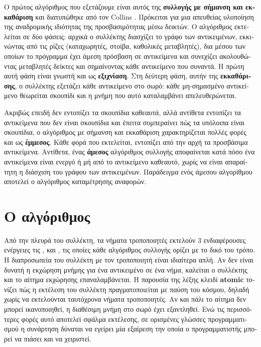 \begin{greek}
Ο πρώτος αλγόριθμος που εξετάζουμε είναι αυτός της 
\textbf{συλλογής με σήμανση και εκκαθάριση} και διατυπώθηκε από
τον Collins \cite{DBLP:journals/cacm/McCarthy60}. Πρόκειται για
μια απευθείας υλοποίηση της αναδρομικής ιδιότητας της προσβασιμότητας
μέσω δεικτών. Ο αλγόριθμος εκτελείται σε δύο φάσεις: αρχικά ο
συλλέκτης διασχίζει το γράφο των αντικειμένων, εκκινώντας από
τις ρίζες (καταχωρητές, στοίβα, καθολικές μεταβλητές), δια μέσου
των οποίων το πρόγραμμα έχει άμεση πρόσβαση σε αντικείμενα
και συνεχίζει ακολουθώντας μεταβλητές δείκτες και σημαίνοντας
κάθε αντικείμενο που συναντά. Η πρώτη αυτή φάση είναι γνωστή και
ως \textbf{εξιχνίαση}. Στη δεύτερη φάση, αυτήν της \textbf{εκκαθάρισης},
ο συλλέκτης εξετάζει κάθε αντικείμενο στο σωρό: κάθε μη-σημασμένο
αντικείμενο θεωρείται σκουπίδι και η μνήμη που αυτό καταλαμβάνει
απελευθερώνεται.

Ακριβώς επειδή δεν εντοπίζει τα σκουπίδια καθεαυτά, αλλά αντίθετα 
εντοπίζει τα αντικείμενα που δεν είναι σκουπίδια και έπειτα 
συμπεραίνει πώς τα υπόλοιπα είναι σκουπίδια, ο αλγόριθμος με 
σήμανση και εκκαθάριση χαρακτηρίζεται πολλές φορές και ως
\textbf{έμμεσος}. Κάθε φορά που εκτελείται, εντοπίζει 
από την αρχή τα προσβάσιμα αντικείμενα. Αντίθετα, ένας 
\textbf{άμεσος} αλγόριθμος συλλογής αποφαίνεται κατά 
πόσο ένα αντικείμενα είναι ενεργό ή μή από το αντικείμενο καθεαυτό, 
χωρίς να είναι απαραίτητη η διάσχιση του γράφου των αντικειμένων. 
Παράδειγμα ενός άμεσου αλγορίθμου αποτελεί ο αλγόριθμος 
καταμέτρησης αναφορών.

\section{Ο αλγόριθμος}
Από την πλευρά του συλλέκτη, τα νήματα τροποποιητές εκτελούν 3 
ενδιαφέρουσες ενέργειες τις ,  και
, τις οποίες κάθε αλγόριθμος συλλογής ορίζει
με το δικό του τρόπο. Η διαπροσωπεία του συλλέκτη με τον τροποποιητή
είναι ιδιαίτερα απλή. Αν δεν είναι δυνατή η εκχώρηση μνήμης για 
ένα αντικειμένο σε ένα νήμα, καλείται ο συλλέκτης και το αίτημα 
εκχώρησης επαναλαμβάνεται. Η παρουσία της λέξης κλειδί 
\textbf{atomic} τονίζει πώς η εκτέλεση του συλλέκτη πραγματοποιείται
με παύση του κόσμου, δηλαδή χωρίς να εκτελούνται ταυτόχρονα νήματα
τροποποιητές. Αν και πάλι το αίτημα δεν μπορεί ικανοποιηθεί, η
διαθέσιμη μνήμη στο σωρό έχει εξαντληθεί. Ενώ τις περισσότερες 
φορές αυτό αποτελεί σφάλμα εκτέλεσης, σε ορισμένες γλώσσες
προγραμματισμού η συνάρτηση  δύναται να εγείρει
μία εξαίρεση την οποία ο προγραμματιστής μπορεί να πιάσει και
να χειριστεί.


\end{greek}
